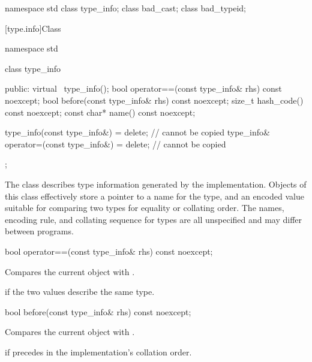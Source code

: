 %
%
%
\begin{codeblock}
namespace std {
  class type_info;
  class bad_cast;
  class bad_typeid;
}
\end{codeblock}

[type.info]{Class }

%
\begin{codeblock}
namespace std {
  class type_info {
  public:
    virtual ~type_info();
    bool operator==(const type_info& rhs) const noexcept;
    bool before(const type_info& rhs) const noexcept;
    size_t hash_code() const noexcept;
    const char* name() const noexcept;

    type_info(const type_info&) = delete;                   // cannot be copied
    type_info& operator=(const type_info&) = delete;        // cannot be copied
  };
}
\end{codeblock}

\pnum
The class
describes type information generated by the implementation.
Objects of this class effectively store a pointer to a name for the type, and
an encoded value suitable for comparing two types for equality or collating order.
The names, encoding rule, and collating sequence for types are all unspecified
%
and may differ between programs.

%
\begin{itemdecl}
bool operator==(const type_info& rhs) const noexcept;
\end{itemdecl}

\begin{itemdescr}
\pnum
\effects
Compares the current object with .

\pnum
\returns
{}
if the two values describe the same type.
\end{itemdescr}

%
\begin{itemdecl}
bool before(const type_info& rhs) const noexcept;
\end{itemdecl}

\begin{itemdescr}
\pnum
\effects
Compares the current object with .

\pnum
\returns
{}
if
precedes  in the implementation's collation order.
\end{itemdescr}


